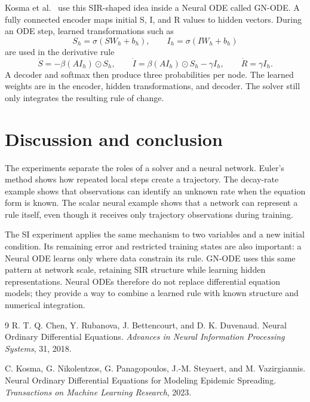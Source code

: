 \documentclass[11pt,a4paper]{article}
\begin{document}
Kosma et al.\ \cite{kosma2023} use this SIR-shaped idea inside a Neural ODE
called GN-ODE. A fully connected encoder maps initial S, I, and R values to
hidden vectors. During an ODE step, learned transformations such as
\[
S_h=\sigma(SW_h+b_h),\qquad I_h=\sigma(IW_h+b_h)
\]
are used in the derivative rule
\[
\dot S=-\beta(AI_h)\odot S_h,\qquad
\dot I=\beta(AI_h)\odot S_h-\gamma I_h,\qquad
\dot R=\gamma I_h.
\]
A decoder and softmax then produce three probabilities per node. The learned
weights are in the encoder, hidden transformations, and decoder. The solver
still only integrates the resulting rule of change.

\section{Discussion and conclusion}

The experiments separate the roles of a solver and a neural network. Euler's
method shows how repeated local steps create a trajectory. The decay-rate
example shows that observations can identify an unknown rate when the equation
form is known. The scalar neural example shows that a network can represent a
rule itself, even though it receives only trajectory observations during
training.

The SI experiment applies the same mechanism to two variables and a new
initial condition. Its remaining error and restricted training states are also
important: a Neural ODE learns only where data constrain its rule. GN-ODE uses
this same pattern at network scale, retaining SIR structure while learning
hidden representations. Neural ODEs therefore do not replace differential
equation models; they provide a way to combine a learned rule with known
structure and numerical integration.

\begin{thebibliography}{9}
R. T. Q. Chen, Y. Rubanova, J. Bettencourt, and D. K. Duvenaud.
\newblock Neural Ordinary Differential Equations.
\newblock \emph{Advances in Neural Information Processing Systems}, 31, 2018.

C. Kosma, G. Nikolentzos, G. Panagopoulos, J.-M. Steyaert, and M. Vazirgiannis.
\newblock Neural Ordinary Differential Equations for Modeling Epidemic Spreading.
\newblock \emph{Transactions on Machine Learning Research}, 2023.
\end{thebibliography}
\end{document}
